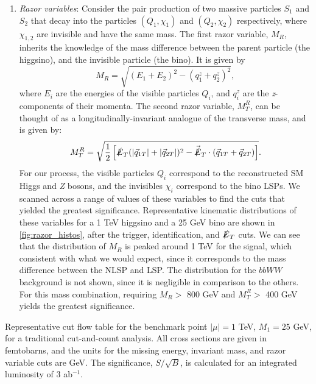 \begin{enumerate}
\begin{marginfigure}
\centering
{}
\caption{Normalized distributions of the razor kinematical variables $M_R$ (top) and $M_T^R$ (bottom) for a 1 TeV higgsino NLSP and 25 GeV bino LSP}
\label{fig:razor_histos}
\end{marginfigure}
\item \emph{Razor variables}: Consider the pair production of two massive particles $S_1$ and $S_2$ that decay into the particles $(Q_1, \chi_1)$ and $(Q_2, \chi_2)$ respectively, where $\chi_{1,2}$ are invisible and have the same mass. The first razor variable, $M_{R}$, inherits the knowledge of the mass difference between the parent particle (the higgsino), and the invisible particle (the bino). It is given by
\[M_R = \sqrt{(E_1+E_2)^2 - (q_1^z + q_2^z)^2},\]
where $E_i$ are the energies of the visible particles $Q_i$, and $q_i^z$ are the \emph{z}-components of their momenta. 
The second razor variable, $M_{T}^{R}$, can be thought of as a longitudinally-invariant analogue of the transverse mass, and is given by:
\[M_T^R = \sqrt{\frac{1}{2}\left[\slashed{E}_T(|\vec{q}_{1T}|+|\vec{q}_{2T}|)^2 - \vec{\slashed{E}}_T\cdot(\vec{q}_{1T}+\vec{q}_{2T})\right]}.\]
For our process, the visible particles $Q_i$ correspond to the reconstructed SM Higgs and \emph{Z} bosons, and the invisibles $\chi_i$ correspond to the bino LSPs. We scanned across a range of values of these variables to find the cuts that yielded the greatest significance. Representative kinematic distributions of these variables for a 1 TeV higgsino and a 25 GeV bino are shown in \autoref{fig:razor_histos}, after the trigger, identification, and $\slashed{E}_{T}$ cuts. We can see that the distribution of $M_R$ is peaked around 1 TeV for the signal, which consistent with what we would expect, since it corresponds to the mass difference between the NLSP and LSP. The distribution for the $bbWW$ background is not shown, since it is negligible in comparison to the others.  For this mass combination, requiring $M_R >$ 800 GeV and $M_T^R >$ 400 GeV yields the greatest significance.
\end{enumerate}

\begin{table}
  \centering
\begin{adjustwidth*}{0in}{-1.5in}
  
  \caption{Representative cut flow table for the benchmark point $|\mu|=1$ TeV, $M_1 = 25$ GeV, for a traditional cut-and-count analysis. All cross sections are given in femtobarns, and the units for the missing energy, invariant mass, and razor variable cuts are GeV. The significance, $S/\sqrt{B}$, is calculated for an integrated luminosity of 3 ab$^{-1}$.}
\label{tab:cc_cutflowtable}
\end{adjustwidth*}
\end{table}

